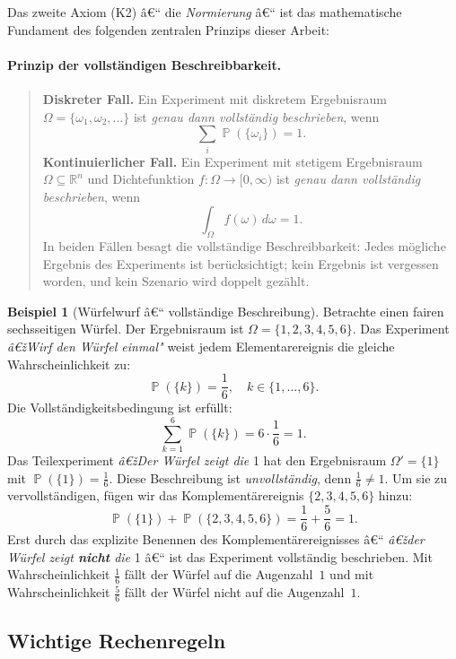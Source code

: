 ﻿\documentclass[12pt,a4paper]{article}
\theoremstyle{definition}
\newtheorem{beispiel}{Beispiel}[section]
\theoremstyle{plain}
\theoremstyle{remark}
\DeclareMathOperator{\Prob}{\mathbb{P}}
\begin{document}
Das zweite Axiom (K2) â€“ die \emph{Normierung} â€“ ist das mathematische Fundament
des folgenden zentralen Prinzips dieser Arbeit:

\paragraph*{Prinzip der vollständigen Beschreibbarkeit.}
\begin{quote}
  \textbf{Diskreter Fall.} Ein Experiment mit diskretem Ergebnisraum
  $\Omega = \{\omega_1, \omega_2, \ldots\}$ ist \emph{genau dann vollständig
  beschrieben}, wenn
  \[
    \sum_{i} \Prob(\{\omega_i\}) = 1.
  \]
  \textbf{Kontinuierlicher Fall.} Ein Experiment mit stetigem Ergebnisraum
  $\Omega \subseteq \mathbb{R}^n$ und Dichtefunktion $f\colon \Omega \to [0,\infty)$
  ist \emph{genau dann vollständig beschrieben}, wenn
  \[
    \int_{\Omega} f(\omega)\, d\omega = 1.
  \]
  In beiden Fällen besagt die vollständige Beschreibbarkeit: Jedes mögliche
  Ergebnis des Experiments ist berücksichtigt; kein Ergebnis ist \glqq
  vergessen\grqq{} worden, und kein Szenario wird doppelt gezählt.
\end{quote}

\begin{beispiel}[Würfelwurf â€“ vollständige Beschreibung]\label{bsp:wuerfel}
  Betrachte einen fairen sechsseitigen Würfel. Der Ergebnisraum ist
  $\Omega = \{1, 2, 3, 4, 5, 6\}$. Das Experiment \emph{â€žWirf den Würfel
  einmal"} weist jedem Elementarereignis die gleiche Wahrscheinlichkeit zu:
  \[
    \Prob(\{k\}) = \frac{1}{6}, \quad k \in \{1,\ldots,6\}.
  \]
  Die Vollständigkeitsbedingung ist erfüllt:
  \[
    \sum_{k=1}^{6} \Prob(\{k\}) = 6 \cdot \frac{1}{6} = 1.
  \]
  Das Teilexperiment \emph{â€žDer Würfel zeigt die } 1 hat den Ergebnisraum
  $\Omega' = \{1\}$ mit $\Prob(\{1\}) = \frac{1}{6}$. Diese Beschreibung ist
  \emph{unvollständig}, denn $\frac{1}{6} \neq 1$. Um sie zu vervollständigen,
  fügen wir das Komplementärereignis $\{2,3,4,5,6\}$ hinzu:
  \[
    \Prob(\{1\}) + \Prob(\{2,3,4,5,6\}) = \frac{1}{6} + \frac{5}{6} = 1.
  \]
  Erst durch das explizite Benennen des Komplementärereignisses â€“ \emph{â€žder
  Würfel zeigt \textbf{nicht} die }1 â€“ ist das Experiment vollständig
  beschrieben. Mit Wahrscheinlichkeit $\frac{1}{6}$ fällt der Würfel auf die
  Augenzahl~$1$ und mit Wahrscheinlichkeit $\frac{5}{6}$ fällt der Würfel
  nicht auf die Augenzahl~$1$.
\end{beispiel}

\subsection{Wichtige Rechenregeln}
\end{document}
